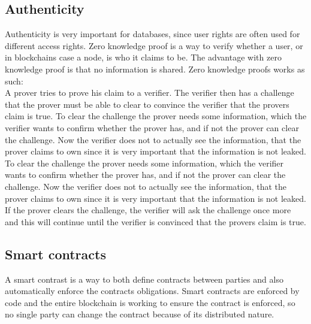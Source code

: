 \subsection{Authenticity}
Authenticity is very important for databases, since user rights are often used for different access rights. Zero knowledge proof is a way to verify whether a user, or in blockchains case a node, is who it claims to be. The advantage with zero knowledge proof is that no information is shared. Zero knowledge proofs works as such:\\
A prover tries to prove his claim to a verifier. The verifier then has a challenge that the prover must be able to clear to convince the verifier that the provers claim is true. To clear the challenge the prover needs some information, which the verifier wants to confirm whether the prover has, and if not the prover can clear the challenge. Now the verifier does not to actually see the information, that the prover claims to own since it is very important that the information is not leaked.  To clear the challenge the prover needs some information, which the verifier wants to confirm whether the prover has, and if not the prover can clear the challenge. Now the verifier does not to actually see the information, that the prover claims to own since it is very important that the information is not leaked. If the prover clears the challenge, the verifier will ask the challenge once more and this will continue until the verifier is convinced that the provers claim is true.

\subsection{Smart contracts}
A smart contrast is a way to both define contracts between parties and also automatically enforce the contracts obligations. Smart contracts are enforced by code and the entire blockchain is working to ensure the contract is enforced, so no single party can change the contract because of its distributed nature\cite{website:blockchaintechnologies}.